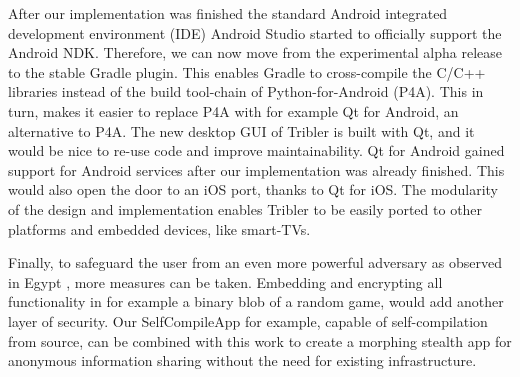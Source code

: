 
After our implementation was finished the standard Android integrated development environment (IDE) Android Studio started to officially support the Android NDK.
Therefore, we can now move from the experimental alpha release to the stable Gradle plugin.
This enables Gradle to cross-compile the C/C++ libraries instead of the build tool-chain of Python-for-Android (P4A).
This in turn, makes it easier to replace P4A with for example Qt for Android, an alternative to P4A.
The new desktop GUI of Tribler is built with Qt, and it would be nice to re-use code and improve maintainability.
Qt for Android gained support for Android services after our implementation was already finished.
This would also open the door to an iOS port, thanks to Qt for iOS.
The modularity of the design and implementation enables Tribler to be easily ported to other platforms and embedded devices, like smart-TVs.

Finally, to safeguard the user from an even more powerful adversary as observed in Egypt \cite{egypt_show_your_facebook_airport}, more measures can be taken.
Embedding and encrypting all functionality in for example a binary blob of a random game, would add another layer of security.
Our SelfCompileApp \cite{mezelf} for example, capable of self-compilation from source, can be combined with this work to create a morphing stealth app for anonymous information sharing without the need for existing infrastructure.


